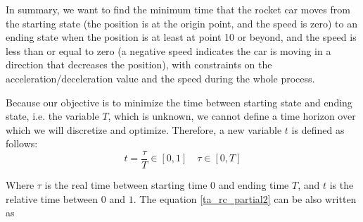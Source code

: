 \documentclass  [
  paper    = a4,
  BCOR     = 10mm,
  twoside,
  fontsize = 12pt,
  fleqn,
  toc      = bibnumbered,
  toc      = listofnumbered,
  numbers  = noendperiod,
  headings = normal,
  listof   = leveldown,
  version  = 3.03
]                                       {scrreprt}
\newcommand{\<}{\langle}
\renewcommand{\>}{\rangle}
\begin{document}
   In summary, we want to find the minimum time that the rocket car moves from the starting state (the position is at the origin point, and the speed is zero) to an ending state when the position is at least at point 10 or beyond, and the speed is less than or equal to zero (a negative speed indicates the car is moving in a direction that decreases the position), with constraints on the acceleration/deceleration value and the speed during the whole process. 
   
   Because our objective is to minimize the time between starting state and ending state, i.e. the variable $T$, which is unknown, we cannot define a time horizon over which we will discretize and optimize. Therefore, a new variable $t$ is defined as follows: 
   \begin{equation}
   t= \frac{\tau}{T} \in [0,1] \quad \tau \in [0, T]
   \label{eqn:timet}
   \end{equation}
   
   Where $\tau$ is the real time between starting time $0$ and ending time $T$, and $t$ is the relative time between $0$ and $1$.  The equation \ref{ta_rc_partial2} can be also written as 
   
\end{document}
